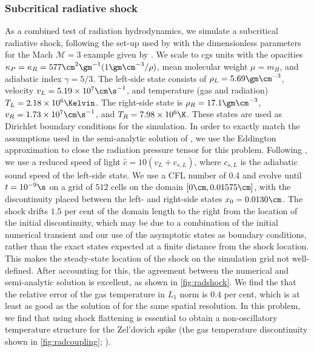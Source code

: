 \documentclass[fleqn,usenatbib]{mnras}
\begin{document}
\subsubsection{Subcritical radiative shock}
\label{section:radshock}
As a combined test of radiation hydrodynamics, we simulate a subcritical radiative shock, following the set-up used by \cite{Skinner_2019} with the dimensionless parameters for the Mach $\mathcal{M} = 3$ example given by \cite{Lowrie_2008}. We scale to cgs units with the opacities $\kappa_P = \kappa_R = 577 \cm^{2} \gm^{-1} (1 \gm \cm^{-3} / \rho)$, mean molecular weight $\mu = m_H$, and adiabatic index $\gamma = 5/3$. The left-side state consists of $\rho_L = 5.69 \gm \cm^{-3}$, velocity $v_L = 5.19 \times 10^7 \cm \s^{-1}$, and temperature (gas and radiation) $T_L = 2.18 \times 10^6 \Kelvin$. The right-side state is $\rho_R = 17.1 \gm \cm^{-3}$, $v_R = 1.73 \times 10^7 \cm \s^{-1}$, and $T_R = 7.98 \times 10^6 \K$. These states are used as Dirichlet boundary conditions for the simulation. In order to exactly match the assumptions used in the semi-analytic solution of \cite{Lowrie_2008}, we use the Eddington approximation to close the radiation pressure tensor for this problem. Following \cite{Skinner_2019}, we use a reduced speed of light $\hat c = 10(v_L + c_{s,L})$, where $c_{s,L}$ is the adiabatic sound speed of the left-side state.  We use a CFL number of 0.4 and evolve until $t = 10^{-9} \s$ on a grid of $512$ cells on the domain $[0 \cm, 0.01575 \cm]$, with the discontinuity placed between the left- and right-side states $x_0 = 0.0130 \cm$. The shock drifts $1.5$ per cent of the domain length to the right from the location of the initial discontinuity, which may be due to a combination of the initial numerical transient and our use of the asymptotic states as boundary conditions, rather than the exact states expected at a finite distance from the shock location. This makes the steady-state location of the shock on the simulation grid not well-defined. After accounting for this, the agreement between the numerical and semi-analytic solution is excellent, as shown in \autoref{fig:radshock}. We find the that the relative error of the gas temperature in $L_1$ norm is $0.4$ per cent, which is at least as good as the solution of \cite{Skinner_2019} for the same spatial resolution.  In this problem, we find that using shock flattening is essential to obtain a non-oscillatory temperature structure for the Zel'dovich spike (the gas temperature discontinuity shown in \autoref{fig:radcoupling}; \citealt{Zeldovich_1967}).
\end{document}
